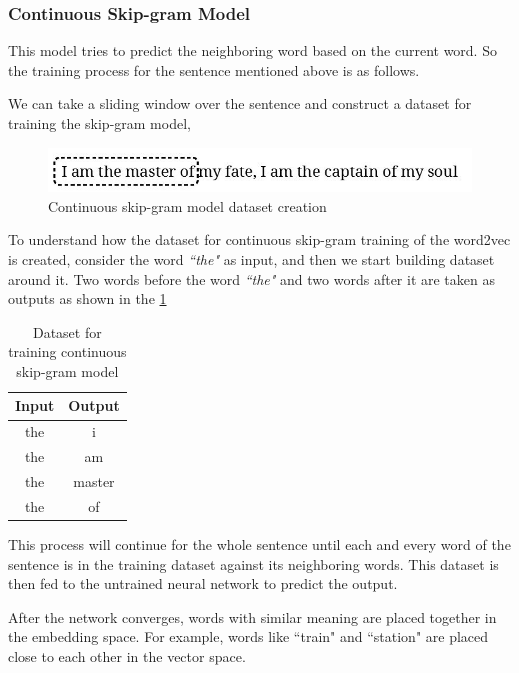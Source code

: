 \subsubsection*{Continuous Skip-gram Model}
This model tries to predict the neighboring word based on the current word. So the training process for the sentence mentioned above is as follows.

We can take a sliding window over the sentence and construct a dataset for training the skip-gram model, 
\begin{figure}[!ht]
    \centering
    \includegraphics[width=12cm]{pics/skipgramWord2vec.jpg}
     \captionsetup{justification=centering,margin=2cm}
    \caption{Continuous skip-gram model dataset creation}
    \label{fig:skipgramWord2vec}
\end{figure}

To understand how the dataset for continuous skip-gram training of the word2vec is created, consider the word \textit{``the"} as input, and then we start building dataset around it.  Two words before the word \textit{``the"} and two words after it  are taken as outputs as shown in the \ref{word2vec-skipgram-dataset}

\begin{table}[!ht]
\centering
\begin{tabular}{cc}
\hline
\textbf{Input} & \textbf{Output} \\ \hline
the            & i               \\ \hline
the            & am              \\ \hline
the            & master          \\ \hline
the            & of              \\ \hline
\end{tabular}
 \captionsetup{justification=centering,margin=2cm}
\caption{Dataset for training continuous skip-gram model}
\label{word2vec-skipgram-dataset}
\end{table}

This process will continue for the whole sentence until each and every word of the sentence is in the training dataset against its neighboring words. This dataset is then fed to the untrained neural network to predict the output.  

After the network converges, words with similar meaning are placed together in the embedding space. For example, words like ``train" and ``station" are placed close to each other in the vector space. 

